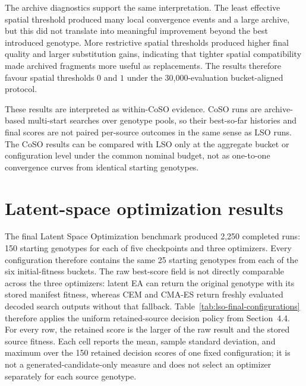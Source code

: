 
The archive diagnostics support the same interpretation. The least effective spatial threshold produced many local convergence events and a large archive, but this did not translate into meaningful improvement beyond the best introduced genotype. More restrictive spatial thresholds produced higher final quality and larger substitution gains, indicating that tighter spatial compatibility made archived fragments more useful as replacements. The results therefore favour spatial thresholds \(0\) and \(1\) under the 30,000-evaluation bucket-aligned protocol.


These results are interpreted as within-CoSO evidence. CoSO runs are archive-based multi-start searches over genotype pools, so their best-so-far histories and final scores are not paired per-source outcomes in the same sense as LSO runs. The CoSO results can be compared with LSO only at the aggregate bucket or configuration level under the common nominal budget, not as one-to-one convergence curves from identical starting genotypes.



\section{Latent-space optimization results}
\label{sec:Latent-space optimization results}

The final Latent Space Optimization benchmark produced 2,250 completed runs: 150 starting genotypes for each of five checkpoints and three optimizers. Every configuration therefore contains the same 25 starting genotypes from each of the six initial-fitness buckets. The raw best-score field is not directly comparable across the three optimizers: latent EA can return the original genotype with its stored manifest fitness, whereas CEM and CMA-ES return freshly evaluated decoded search outputs without that fallback. Table~\ref{tab:lso-final-configurations} therefore applies the uniform retained-source decision policy from Section~4.4. For every row, the retained score is the larger of the raw result and the stored source fitness. Each cell reports the mean, sample standard deviation, and maximum over the 150 retained decision scores of one fixed configuration; it is not a generated-candidate-only measure and does not select an optimizer separately for each source genotype.

